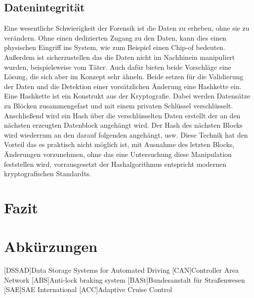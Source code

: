 \documentclass[conference,compsoc,final,a4paper]{IEEEtran}
\begin{document}
\subsection{Datenintegrität}

Eine wesentliche Schwierigkeit der Forensik ist die Daten zu erheben, ohne sie zu verändern. Ohne einen dedizierten Zugang
zu den Daten, kann dies einen physischen Eingriff ins System, wie zum Beispiel einen Chip-of bedeuten.
Außerdem ist sicherzustellen das die Daten nicht im Nachhinein manipuliert wurden, beispielsweise vom Täter.
Auch dafür bieten beide Vorschläge eine Lösung, die sich aber im Konzept sehr ähneln.
Beide setzen für die Validierung der Daten und die Detektion einer vorsätzlichen Änderung eine Hashkette ein.\\
Eine Hashkette ist ein Konstrukt aus der Kryptografie.
Dabei werden Datensätze zu Blöcken zusammengefast und mit einem privaten Schlüssel verschlüsselt.
Anschließend wird ein Hash über die verschlüsselten Daten erstellt der an den nächsten erzeugten Datenblock angehängt wird.
Der Hash des nächsten Blocks wird wiederrum an den darauf folgenden angehängt, usw.
Diese Technik hat den Vorteil das es praktisch nicht möglich ist, mit Ausnahme des letzten Blocks, Änderungen vorzunehmen, ohne das eine
Untersuchung diese Manipulation feststellen wird, vorrausgesetzt der Hashalgorithmus entspricht modernen kryptografischen Standardts.

\section{Fazit}


\section*{Abkürzungen}

\begin{acronym}[IEEE]
  [DSSAD]{Data Storage Systems for Automated Driving}
  [CAN]{Controller Area Network}
  [ABS]{Anti-lock braking system}
  [BASt]{Bundesanstalt für Straßenwesen}
  [SAE]{SAE International}
  [ACC]{Adaptive Cruise Control}
\end{acronym}

\printbibliography
\end{document}
